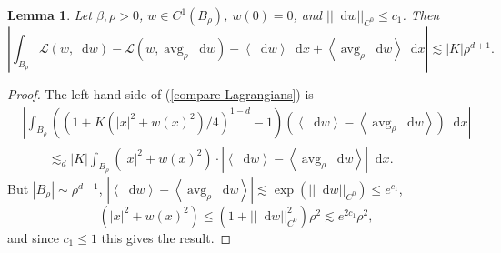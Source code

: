 \documentclass[reqno,10pt]{amsart}
\DeclareMathOperator{\avg}{avg}
\newcommand*\dif{\mathop{}\!\mathrm{d}}
\newcommand{\Lagrange}{\mathscr L}
\def\Japan#1{\left \langle #1 \right \rangle}
\newtheorem{lemma}[theorem]{Lemma}
\theoremstyle{definition}
\numberwithin{equation}{section}
\begin{document}
\begin{lemma}
Let $\beta, \rho > 0$, $w \in C^1(B_\rho)$, $w(0) = 0$, and $||\dif w||_{C^0} \leq c_1$. Then
\begin{equation}\label{compare Lagrangians}
\left|\int_{B_\rho} \Lagrange(w, \dif w) - \Lagrange(w, \avg_\rho \dif w) - \Japan{\dif w} \dif x + \Japan{\avg_\rho \dif w} \dif x\right|
\lesssim |K| \rho^{d + 1}.
\end{equation}
\end{lemma}
\begin{proof}
The left-hand side of (\ref{compare Lagrangians}) is
\begin{align*}
&\left|\int_{B_\rho} ((1 + K(|x|^2 + w(x)^2)/4)^{1 - d} - 1)(\Japan{\dif w} - \Japan{\avg_\rho \dif w}) \dif x\right| \\
&\qquad \lesssim_d |K| \int_{B_\rho} (|x|^2 + w(x)^2) \cdot \left|\Japan{\dif w} - \Japan{\avg_\rho \dif w}\right| \dif x.
\end{align*}
But $|B_\rho| \sim \rho^{d - 1}$, $|\Japan{\dif w} - \Japan{\avg_\rho \dif w}| \lesssim \exp(||\dif w||_{C^0}) \leq e^{c_1}$,
$$(|x|^2 + w(x)^2) \leq (1 + ||\dif w||_{C^0}^2) \rho^2 \lesssim e^{2c_1} \rho^2,$$
and since $c_1 \leq 1$ this gives the result.
\end{proof}
\end{document}
